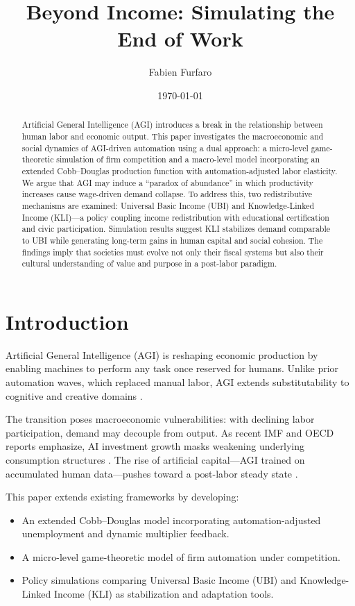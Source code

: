 \documentclass[10pt,a4paper]{article}
\title{Beyond Income: Simulating the End of Work}
\author{Fabien Furfaro}
\date{\today}
\begin{document}
\maketitle

\begin{abstract}
Artificial General Intelligence (AGI) introduces a break in the relationship between human labor and economic output. This paper investigates the macroeconomic and social dynamics of AGI-driven automation using a dual approach: a micro-level game-theoretic simulation of firm competition and a macro-level model incorporating an extended Cobb--Douglas production function with automation-adjusted labor elasticity. We argue that AGI may induce a “paradox of abundance” in which productivity increases cause wage-driven demand collapse. To address this, two redistributive mechanisms are examined: Universal Basic Income (UBI) and Knowledge-Linked Income (KLI)—a policy coupling income redistribution with educational certification and civic participation. Simulation results suggest KLI stabilizes demand comparable to UBI while generating long-term gains in human capital and social cohesion. The findings imply that societies must evolve not only their fiscal systems but also their cultural understanding of value and purpose in a post-labor paradigm.
\end{abstract}

\tableofcontents

\section{Introduction}
Artificial General Intelligence (AGI) is reshaping economic production by enabling machines to perform any task once reserved for humans. Unlike prior automation waves, which replaced manual labor, AGI extends substitutability to cognitive and creative domains \cite{OECD2025,IMF2025}. 

The transition poses macroeconomic vulnerabilities: with declining labor participation, demand may decouple from output. As recent IMF and OECD reports emphasize, AI investment growth masks weakening underlying consumption structures \cite{CNBC2025,OECD2025}. The rise of artificial capital—AGI trained on accumulated human data—pushes toward a post-labor steady state \cite{SSRN2025,Goldman2025,HAI2025}.

This paper extends existing frameworks by developing:
\begin{itemize}
    \item An extended Cobb--Douglas model incorporating automation-adjusted unemployment and dynamic multiplier feedback.
    \item A micro-level game-theoretic model of firm automation under competition.
    \item Policy simulations comparing Universal Basic Income (UBI) and Knowledge-Linked Income (KLI) as stabilization and adaptation tools.
\end{itemize}
\end{document}
